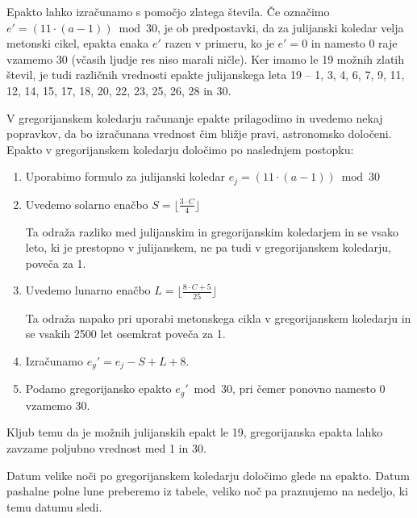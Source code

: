 \documentclass[a4paper,12pt]{article}
\begin{document}
Epakto lahko izračunamo s pomočjo zlatega števila.
Če označimo $e' = (11 \cdot (a - 1)) \bmod 30$, je ob predpostavki, da za 
julijanski koledar velja metonski cikel, epakta enaka $e'$ razen v primeru, ko 
je $e' = 0$ in namesto 0 raje vzamemo 30 (včasih ljudje res niso marali ničle).
Ker imamo le 19 možnih zlatih števil, je tudi različnih vrednosti epakte 
julijanskega leta 19 -- 1, 3, 4, 6, 7, 9, 11, 12, 14, 15, 17, 18, 20, 22, 23, 25, 26, 28 in 30.

V gregorijanskem koledarju računanje epakte prilagodimo in uvedemo nekaj 
popravkov, da bo izračunana vrednost čim bližje pravi, astronomsko določeni. 
Epakto v gregorijanskem koledarju določimo po naslednjem postopku:

\begin{enumerate}
    \item Uporabimo formulo za julijanski koledar 
        $e_j = (11 \cdot (a - 1)) \bmod 30$
    \item Uvedemo solarno enačbo $S = \lfloor \frac{3 \cdot C}{4} \rfloor $

        Ta odraža razliko med julijanskim in gregorijanskim koledarjem in se 
        vsako leto, ki je prestopno v julijanskem, ne pa tudi v gregorijanskem 
        koledarju, poveča za 1.
    \item Uvedemo lunarno enačbo $L = \lfloor \frac{8 \cdot C + 5}{25} \rfloor $
        
        Ta odraža napako pri uporabi metonskega cikla v gregorijanskem 
        koledarju in se vsakih 2500 let osemkrat poveča za 1.
    \item Izračunamo $e_g' = e_j - S + L + 8$. 
    \item Podamo gregorijansko epakto $e_g' \bmod 30$, pri čemer ponovno 
        namesto 0 vzamemo 30.
\end{enumerate}

Kljub temu da je možnih julijanskih epakt le 19, gregorijanska epakta lahko 
zavzame poljubno vrednost med 1 in 30.

Datum velike noči po gregorijanskem koledarju določimo glede na epakto. Datum 
pashalne polne lune preberemo iz tabele, veliko noč pa praznujemo na nedeljo, 
ki temu datumu sledi.
\end{document}
